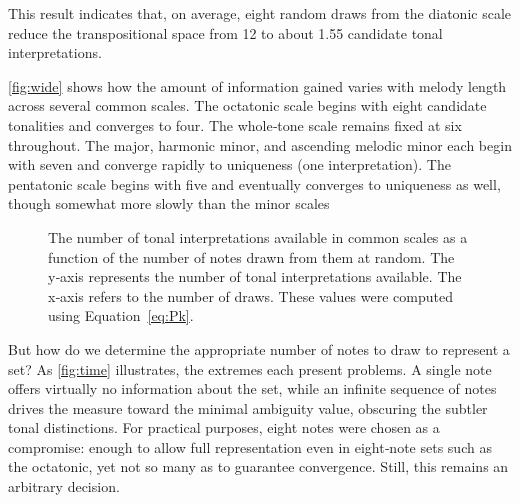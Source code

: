 \documentclass[10pt,twocolumn]{article}
\numberwithin{equation}{section} %
\begin{document}
    This result indicates that, on average, eight random draws from the diatonic scale reduce the transpositional space from 12 to about 1.55 candidate tonal interpretations.

    \autoref{fig:wide} shows how the amount of information gained varies with melody length across several common scales.
    The octatonic scale begins with eight candidate tonalities and converges to four.
    The whole‑tone scale remains fixed at six throughout.
    The major, harmonic minor, and ascending melodic minor each begin with seven and converge rapidly to uniqueness (one interpretation).
    The pentatonic scale begins with five and eventually converges to uniqueness as well, though somewhat more slowly than the minor scales

    \begin{figure}[htbp]
        \centering
        \caption{The number of tonal interpretations available in common scales as a function of the number of notes drawn from them at random.
        The y‑axis represents the number of tonal interpretations available.
        The x‑axis refers to the number of draws.
        These values were computed using Equation~\ref{eq:Pk}.}
        \label{fig:wide}
    \end{figure}

    But how do we determine the appropriate number of notes to draw to represent a set?
    As \autoref{fig:time} illustrates, the extremes each present problems.
    A single note offers virtually no information about the set, while an infinite sequence of notes drives the measure toward the minimal ambiguity value, obscuring the subtler tonal distinctions.
    For practical purposes, eight notes were chosen as a compromise: enough to allow full representation even in eight‑note sets such as the octatonic, yet not so many as to guarantee convergence.
    Still, this remains an arbitrary decision.
\end{document}
